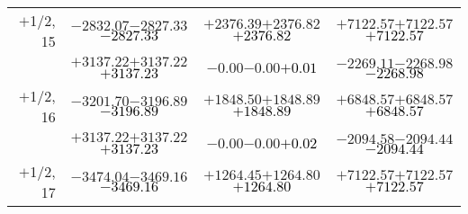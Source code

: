 \documentclass[compress]{beamer}
\begin{document}
\begin{frame}
{\begin{tabular}{r | c | c | c}
$+$1/2, 15 & $-2832.07$\hspace{0.1 cm}$-2827.33$\hspace{0.1 cm}\textcolor{black}{$-2827.33$} & $+2376.39$\hspace{0.1 cm}$+2376.82$\hspace{0.1 cm}\textcolor{black}{$+2376.82$} & $+7122.57$\hspace{0.1 cm}$+7122.57$\hspace{0.1 cm}\textcolor{black}{$+7122.57$} \\
           & $+3137.22$\hspace{0.1 cm}$+3137.22$\hspace{0.1 cm}\textcolor{black}{$+3137.23$} & $-0.00$\hspace{0.1 cm}$-0.00$\hspace{0.1 cm}\textcolor{black}{$+0.01$} & $-2269.11$\hspace{0.1 cm}$-2268.98$\hspace{0.1 cm}\textcolor{black}{$-2268.98$} \\
$+$1/2, 16 & $-3201.70$\hspace{0.1 cm}$-3196.89$\hspace{0.1 cm}\textcolor{black}{$-3196.89$} & $+1848.50$\hspace{0.1 cm}$+1848.89$\hspace{0.1 cm}\textcolor{black}{$+1848.89$} & $+6848.57$\hspace{0.1 cm}$+6848.57$\hspace{0.1 cm}\textcolor{black}{$+6848.57$} \\
           & $+3137.22$\hspace{0.1 cm}$+3137.22$\hspace{0.1 cm}\textcolor{black}{$+3137.23$} & $-0.00$\hspace{0.1 cm}$-0.00$\hspace{0.1 cm}\textcolor{black}{$+0.02$} & $-2094.58$\hspace{0.1 cm}$-2094.44$\hspace{0.1 cm}\textcolor{black}{$-2094.44$} \\
$+$1/2, 17 & $-3474.04$\hspace{0.1 cm}$-3469.16$\hspace{0.1 cm}\textcolor{black}{$-3469.16$} & $+1264.45$\hspace{0.1 cm}$+1264.80$\hspace{0.1 cm}\textcolor{black}{$+1264.80$} & $+7122.57$\hspace{0.1 cm}$+7122.57$\hspace{0.1 cm}\textcolor{black}{$+7122.57$} \\

\end{tabular}}
\end{frame}
\end{document}
